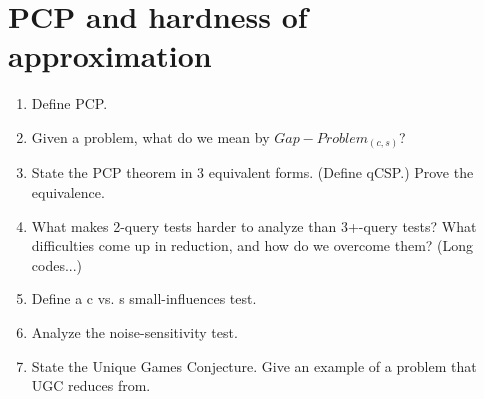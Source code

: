 \section{PCP and hardness of approximation}
\begin{enumerate}
\item
Define PCP.
\item
Given a problem, what do we mean by $Gap-Problem_{(c,s)}$?
\item
State the PCP theorem in 3 equivalent forms. (Define qCSP.) Prove the equivalence.
\item 
What makes 2-query tests harder to analyze than 3+-query tests? What difficulties come up in reduction, and how do we overcome them? (Long codes...)
\item Define a c vs. s small-influences test.
\item Analyze the noise-sensitivity test.
\item State the Unique Games Conjecture. Give an example of a problem that UGC reduces from.
\end{enumerate}
